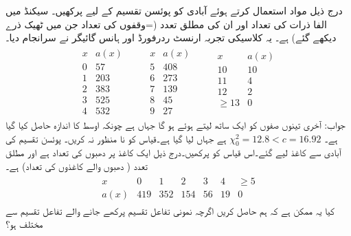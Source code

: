 \quad
درج ذیل مواد استعمال کرتے ہوئے آبادی کو پوئسن تقسیم کے لیے پرکھیں۔ سیکنڈ میں الفا ذرات کی تعداد  اور  ان کی مطلق تعدد (=وقفوں کی تعداد جن میں ٹھیک  ذرے دیکھے گئے) ہے۔ یہ کلاسیکی تجربہ ارنسٹ ردرفورڈ اور ہانس گائیگر نے  سرانجام دیا۔
\begin{align*}
\begin{array}{rr}
x&a(x)\\
\hline
0&57\\
1&203\\
2&383\\
3&525\\
4&532
\end{array}\quad\quad
\begin{array}{rr}
x&a(x)\\
\hline
5&408\\
6&273\\
7&139\\
8&45\\
9&27
\end{array}\quad\quad
\begin{array}{rr}
x&a(x)\\
\hline
10&10\\
11&4\\
12&2\\
\ge 13&0\\
&
\end{array}
\end{align*}
جواب:\quad
آخری تینوں صفوں کو ایک ساتھ لیتے ہوئے  ہو گا جہاں  ہے چونکہ اوسط کا اندازہ حاصل کیا گیا ہے۔
$\chi^2_0=12.8<c=16.92$
ہے جہاں  لیا گیا ہے۔قیاس کو نا منظور نہ کریں۔ 
\quad
پوئسن تقسیم کی  آبادی سے  کاغذ لیے گئے۔اس قیاس کو پرکھیں۔درج ذیل ایک کاغذ پر دھبوں کی تعداد  ہے اور   مطلق تعدد ( دھبوں والے کاغذوں کی تعداد) ہے۔  
\begin{align*}
\begin{array}{ccccccc}
x&0&1&2&3&4&\ge 5\\
a(x)&419&352&154&56&19&0
\end{array}
\end{align*}
\quad
کیا یہ ممکن ہے کہ ہم  حاصل کریں اگرچہ  نمونی تفاعل تقسیم پرکھے جانے والے  تفاعل تقسیم  سے مختلف ہو؟


